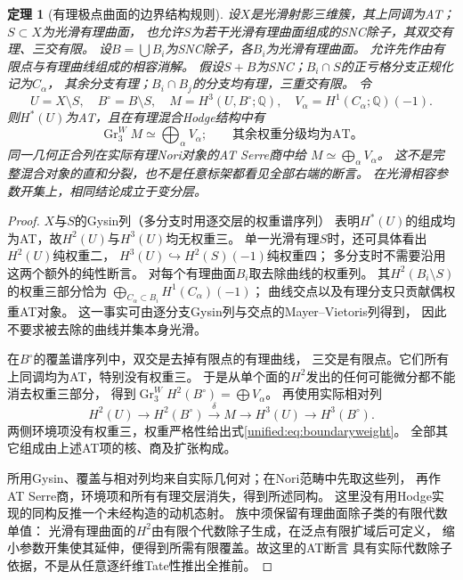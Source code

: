 \documentclass[11pt,a4paper,oneside]{ctexart}
\theoremstyle{cnplain}
\newtheorem{theorem}{定理}[section]
\theoremstyle{definition}
\theoremstyle{remark}
\newcommand{\Q}{\mathbb Q}
\numberwithin{equation}{section}
\begin{document}
\begin{theorem}[有理极点曲面的边界结构规则]\label{unified:thm:boundaryweight}
设$X$是光滑射影三维簇，其上同调为AT；$S\subset X$为光滑有理曲面，
也允许$S$为若干光滑有理曲面组成的SNC除子，其双交有理、三交有限。
设$B=\bigcup B_i$为SNC除子，各$B_i$为光滑有理曲面。
允许先作由有限点与有理曲线组成的相容消解。
假设$S+B$为SNC；$B_i\cap S$的正亏格分支正规化记为$C_\alpha$，
其余分支有理；$B_i\cap B_j$的分支均有理，三重交有限。
令
\[
 U=X\setminus S,\quad B^\circ=B\setminus S,\quad
 M=H^3(U,B^\circ;\Q),\quad V_\alpha=H^1(C_\alpha;\Q)(-1).
\]
则$H^*(U)$为AT，且在有理混合Hodge结构中有
\begin{equation}\label{unified:eq:boundaryweight}
 \operatorname{Gr}^W_3 M\simeq\bigoplus_\alpha V_\alpha;
 \qquad\text{其余权重分级均为AT。}
\end{equation}
同一几何正合列在实际有理Nori对象的AT Serre商中给
$M\simeq\bigoplus_\alpha V_\alpha$。
这不是完整混合对象的直和分裂，也不是任意标架都看见全部右端的断言。
在光滑相容参数开集上，相同结论成立于变分层。
\end{theorem}
\begin{proof}
$X$与$S$的Gysin列（多分支时用逐交层的权重谱序列）
表明$H^*(U)$的组成均为AT，故$H^2(U)$与$H^3(U)$均无权重三。
单一光滑有理$S$时，还可具体看出$H^2(U)$纯权重二，
$H^3(U)\hookrightarrow H^2(S)(-1)$纯权重四；
多分支时不需要沿用这两个额外的纯性断言。
对每个有理曲面$B_i$取去除曲线的权重列。
其$H^2(B_i\setminus S)$的权重三部分恰为
$\bigoplus_{C_\alpha\subset B_i}H^1(C_\alpha)(-1)$；
曲线交点以及有理分支只贡献偶权重AT对象。
这一事实可由逐分支Gysin列与交点的Mayer--Vietoris列得到，
因此不要求被去除的曲线并集本身光滑。

在$B^\circ$的覆盖谱序列中，双交是去掉有限点的有理曲线，
三交是有限点。它们所有上同调均为AT，特别没有权重三。
于是从单个面的$H^2$发出的任何可能微分都不能消去权重三部分，
得到$\operatorname{Gr}^W_3H^2(B^\circ)=\bigoplus V_\alpha$。
再使用实际相对列
\begin{equation}\label{unified:eq:boundaryrelative}
 H^2(U)\longrightarrow H^2(B^\circ)
 \overset{\delta}{\longrightarrow}M
 \longrightarrow H^3(U)\longrightarrow H^3(B^\circ).
\end{equation}
两侧环境项没有权重三，权重严格性给出式\eqref{unified:eq:boundaryweight}。
全部其它组成由上述AT项的核、商及扩张构成。

所用Gysin、覆盖与相对列均来自实际几何对；在Nori范畴中先取这些列，
再作AT Serre商，环境项和所有有理交层消失，得到所述同构。
这里没有用Hodge实现的同构反推一个未经构造的动机态射。
族中须保留有理曲面除子类的有限代数单值：
光滑有理曲面的$H^2$由有限个代数除子生成，在泛点有限扩域后可定义，
缩小参数开集使其延伸，便得到所需有限覆盖。故这里的AT断言
具有实际代数除子依据，不是从任意逐纤维Tate性推出全推前。
\end{proof}
\end{document}
